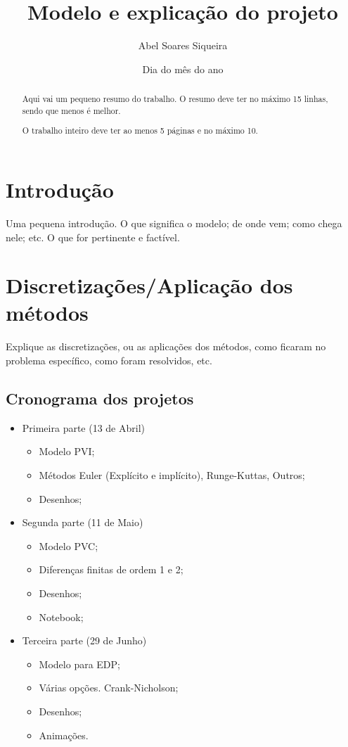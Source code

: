 \documentclass[a4paper,12pt]{article}
\title{Modelo e explicação do projeto}
\author{Abel Soares Siqueira}
\date{Dia do mês do ano}
\begin{document}
\maketitle

\begin{abstract}
  Aqui vai um pequeno resumo do trabalho.
  O resumo deve ter no máximo 15 linhas, sendo que menos é melhor.

  O trabalho inteiro deve ter ao menos 5 páginas e no máximo 10.
\end{abstract}

\section{Introdução}

Uma pequena introdução. O que significa o modelo; de onde vem; como chega nele;
etc. O que for pertinente e factível.

\section{Discretizações/Aplicação dos métodos}

Explique as discretizações, ou as aplicações dos métodos, como ficaram no
problema específico, como foram resolvidos, etc.

\subsection{Cronograma dos projetos}

\begin{itemize}
  \item Primeira parte (13 de Abril)
    \begin{itemize}
      \item Modelo PVI;
      \item Métodos Euler (Explícito e implícito), Runge-Kuttas, Outros;
      \item Desenhos;
    \end{itemize}
  \item Segunda parte (11 de Maio)
    \begin{itemize}
      \item Modelo PVC;
      \item Diferenças finitas de ordem 1 e 2;
      \item Desenhos;
      \item Notebook;
    \end{itemize}
  \item Terceira parte (29 de Junho)
    \begin{itemize}
      \item Modelo para EDP;
      \item Várias opções. Crank-Nicholson;
      \item Desenhos;
      \item Animações.
    \end{itemize}
\end{itemize}
\end{document}
